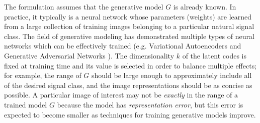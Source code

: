 \documentclass[11pt]{article}
\newcommand{\G}{G}
\newcommand{\red}[1]{{\color{red} {#1}}}
\theoremstyle{remark}
\begin{document}
%
%
% 
% 
% 

The formulation assumes that the generative model $\G$ is already known.  In practice, it typically is a neural network whose parameters (weights) are learned from a large collection of training images belonging to a particular natural signal class.  The field of generative modeling has demonstrated multiple types of neural networks which can be effectively trained (e.g. Variational Autoencoders \cite{Kingma2014} and Generative Adversarial Networks \cite{Goodfellow2014}).  The dimensionality $k$ of the latent codes is fixed at training time and its value is selected in order to balance multiple effects; for example, the range of $\G$ should be large enough to approximately include all of the desired signal class, and the image representations should be as concise as possible. A particular image of interest may not be \textit{exactly} in the range of a trained model $\G$ because the model has \textit{representation error}, but this error is expected to become smaller as techniques for training generative models improve.
 
\end{document}

